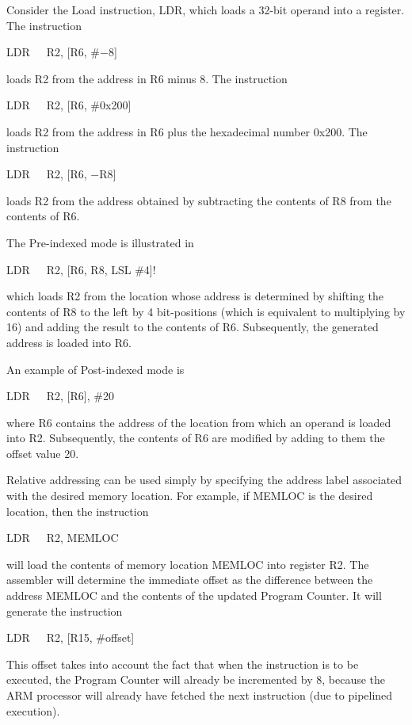 \documentclass[11pt, twoside, pdftex]{article}
\begin{document}
Consider the Load instruction, LDR, which loads a 32-bit operand
into a register. The instruction
\begin{center}
LDR~~~R2, [R6, \#$-$8]
\end{center}
\noindent
loads R2 from the address in R6 minus 8. The instruction
\begin{center}
LDR~~~R2, [R6, \#0x200]
\end{center}
\noindent
loads R2 from the address in R6 plus the hexadecimal number
0x200. The instruction
\begin{center}
LDR~~~R2, [R6, $-$R8]
\end{center}
\noindent
loads R2 from the address obtained by subtracting the contents
of R8 from the contents of R6.

The Pre-indexed mode is illustrated in 
\begin{center}
LDR~~~R2, [R6, R8, LSL \#4]!
\end{center}
\noindent
which loads R2 from the location whose address is determined by
shifting the contents of R8 to the left by 4 bit-positions
(which is equivalent to multiplying by 16) and adding the result
to the contents of R6. Subsequently, the generated address is
loaded into R6.

An example of Post-indexed mode is
\begin{center}
LDR~~~R2, [R6], \#20
\end{center}
\noindent
where R6 contains the address of the location from which an
operand is loaded into R2. Subsequently, the contents of R6
are modified by adding to them the offset value 20.

Relative addressing can be used simply by specifying the address
label associated with the desired memory location. 
For example, if MEMLOC is the desired location, then the
instruction
\begin{center}
LDR~~~R2, MEMLOC
\end{center}
\noindent
will load the contents of memory location MEMLOC into register
R2. The assembler will determine the immediate offset as the
difference between the address MEMLOC and the contents of the
updated Program Counter. It will generate the instruction
\begin{center}
LDR~~~R2, [R15, \#offset]
\end{center}
\noindent
This offset takes into account the fact that when the instruction
is to be executed, the Program Counter will already be
incremented by 8, because the ARM processor will already have fetched the next instruction (due to pipelined execution). 
\end{document}
